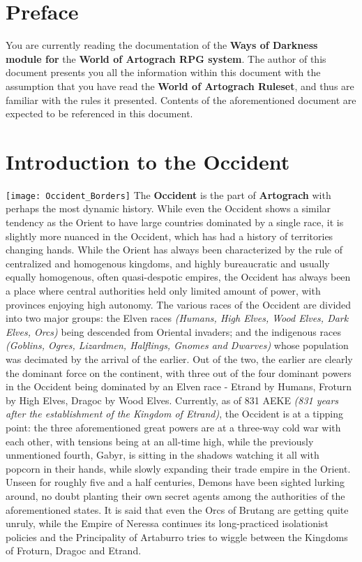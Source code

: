 \documentclass[openany,10pt,a4paper]{book}
\begin{document}
\maketitle
\tableofcontents
\chapter*{Preface}
You are currently reading the documentation of the \textbf{Ways of Darkness module for} the \textbf{World of Artograch RPG system}. The author of this document presents you all the information within this document with the assumption that you have read the \textbf{World of Artograch Ruleset}, and thus are familiar with the rules it presented. Contents of the aforementioned document are expected to be referenced in this document.
\chapter{Introduction to the Occident}
\texttt{[image: Occident\_Borders]}
\newpage
The \textbf{Occident} is the part of \textbf{Artograch} with perhaps the most dynamic history. While even the Occident shows a similar tendency as the Orient to have large countries dominated by a single race, it is slightly more nuanced in the Occident, which has had a history of territories changing hands. While the Orient has always been characterized by the rule of centralized and homogenous kingdoms, and highly bureaucratic and usually equally homogenous, often quasi-despotic empires, the Occident has always been a place where central authorities held only limited amount of power, with provinces enjoying high autonomy.\newline
The various races of the Occident are divided into two major groups: the Elven races \textit{(Humans, High Elves, Wood Elves, Dark Elves, Orcs)} being descended from Oriental invaders; and the indigenous races \textit{(Goblins, Ogres, Lizardmen, Halflings, Gnomes and Dwarves)} whose population was decimated by the arrival of the earlier. Out of the two, the earlier are clearly the dominant force on the continent, with three out of the four dominant powers in the Occident being dominated by an Elven race - Etrand by Humans, Froturn by High Elves, Dragoc by Wood Elves.\newline
Currently, as of 831 AEKE \textit{(831 years after the establishment of the Kingdom of Etrand)}, the Occident is at a tipping point: the three aforementioned great powers are at a three-way cold war with each other, with tensions being at an all-time high, while the previously unmentioned fourth, Gabyr, is sitting in the shadows watching it all with popcorn in their hands, while slowly expanding their trade empire in the Orient. Unseen for roughly five and a half centuries, Demons have been sighted lurking around, no doubt planting their own secret agents among the authorities of the aforementioned states. It is said that even the Orcs of Brutang are getting quite unruly, while the Empire of Neressa continues its long-practiced isolationist policies and the Principality of Artaburro tries to wiggle between the Kingdoms of Froturn, Dragoc and Etrand.
\end{document}
